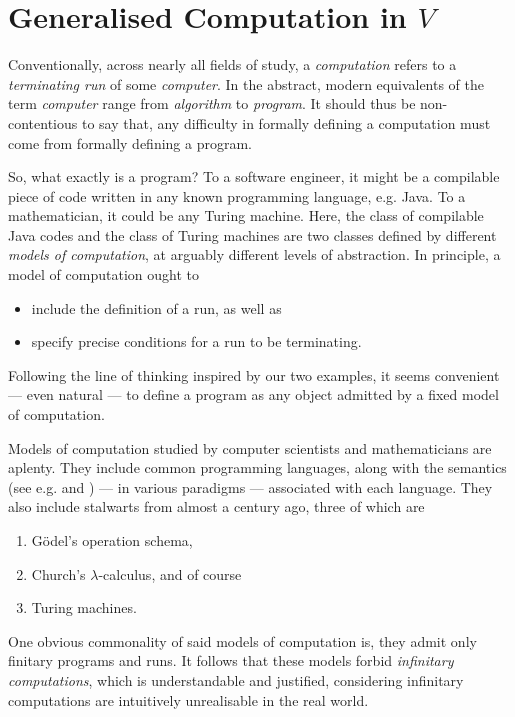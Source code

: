 \documentclass[12pt, twoside]{memoir}
\numberwithin{equation}{section}
\theoremstyle{definition}
\theoremstyle{remark}
\theoremstyle{definition}
\theoremstyle{definition}
\theoremstyle{definition}
\theoremstyle{remark}
\begin{document}
\chapter{Generalised Computation in $V$}\label{chap6}

Conventionally, across nearly all fields of study, a \textit{computation} refers to a \textit{terminating run} of some \textit{computer}. In the abstract, modern equivalents of the term \textit{computer} range from \textit{algorithm} to \textit{program}. It should thus be non-contentious to say that, any difficulty in formally defining a computation must come from formally defining a program.

So, what exactly is a program? To a software engineer, it might be a compilable piece of code written in any known programming language, e.g. Java. To a mathematician, it could be any Turing machine. Here, the class of compilable Java codes and the class of Turing machines are two classes defined by different \textit{models of computation}, at arguably different levels of abstraction. In principle, a model of computation ought to 
\begin{itemize}
    \item include the definition of a run, as well as
    \item specify precise conditions for a run to be terminating.
\end{itemize} 
Following the line of thinking inspired by our two examples, it seems convenient --- even natural --- to define a program as any object admitted by a fixed model of computation. 

Models of computation studied by computer scientists and mathematicians are aplenty. They include common programming languages, along with the semantics (see e.g.\cite{scott} and \cite{meyer}) --- in various paradigms --- associated with each language. They also include stalwarts from almost a century ago, three of which are
\begin{enumerate}[leftmargin=40pt, label=(CT\arabic*)]
    \item\label{ct1} G\"{o}del's operation schema,
    \item Church's $\lambda$-calculus, and of course
    \item\label{ct3} Turing machines.
\end{enumerate}
One obvious commonality of said models of computation is, they admit only finitary programs and runs. It follows that these models forbid \textit{infinitary computations}, which is understandable and justified, considering infinitary computations are intuitively unrealisable in the real world. 
\end{document}
